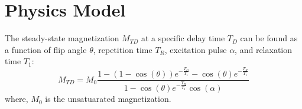 \documentclass{article}         %
\theoremstyle{definition}
\theoremstyle{remark}
\begin{document}
 

%

%
%


\section{Physics Model}\label{PhysicsModel}
The steady-state magnetization $M_{TD}$ at a specific delay time $T_D$ can be found as a function of flip angle $\theta$, repetition time $T_R$, excitation pulse $\alpha$, and relaxation time  $T_1$:
\[
  M_{TD}  =  M_0\frac{1-(1-\cos(\theta))e^{-\frac{T_D}{T_1}}-\cos(\theta)e^{-\frac{T_R}{T_1}}}{1-\cos(\theta)e^{-\frac{T_R}{T_1}}\cos(\alpha)}
\]
where, $M_0$ is the unsatuarated magnetization.
\end{document}
